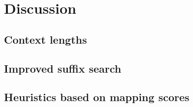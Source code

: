 \documentclass[thesis.tex]{subfiles}
\begin{document}
\chapter{Discussion}
\section{Context lengths}
\section{Improved suffix search}
\section{Heuristics based on mapping scores}
\end{document}
